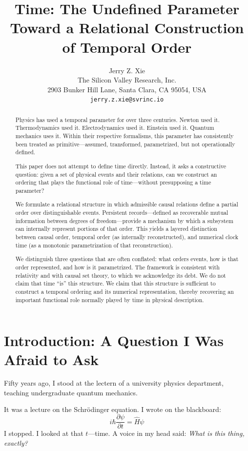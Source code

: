\documentclass[12pt, a4paper]{article}
\title{Time: The Undefined Parameter \\
\large Toward a Relational Construction of Temporal Order}
\author{
  Jerry Z. Xie \\
  \small The Silicon Valley Research, Inc. \\
  \small 2903 Bunker Hill Lane, Santa Clara, CA 95054, USA \\
  \small \texttt{jerry.z.xie@svrinc.io}
}
\date{}
\begin{document}
\maketitle

\begin{abstract}
Physics has used a temporal parameter for over three centuries. Newton used it. Thermodynamics used it. Electrodynamics used it. Einstein used it. Quantum mechanics uses it. Within their respective formalisms, this parameter has consistently been treated as primitive---assumed, transformed, parametrized, but not operationally defined.

This paper does not attempt to define time directly. Instead, it asks a constructive question: given a set of physical events and their relations, can we construct an ordering that plays the functional role of time---without presupposing a time parameter?

We formulate a relational structure in which admissible causal relations define a partial order over distinguishable events. Persistent records---defined as recoverable mutual information between degrees of freedom---provide a mechanism by which a subsystem can internally represent portions of that order. This yields a layered distinction between causal order, temporal order (as internally reconstructed), and numerical clock time (as a monotonic parametrization of that reconstruction).

We distinguish three questions that are often conflated: what orders events, how is that order represented, and how is it parametrized. The framework is consistent with relativity and with causal set theory, to which we acknowledge its debt. We do not claim that time ``is'' this structure. We claim that this structure is sufficient to construct a temporal ordering and its numerical representation, thereby recovering an important functional role normally played by time in physical description.
\end{abstract}

\section{Introduction: A Question I Was Afraid to Ask}

Fifty years ago, I stood at the lectern of a university physics department, teaching undergraduate quantum mechanics.

It was a lecture on the Schr\"odinger equation. I wrote on the blackboard:
\[
i\hbar \frac{\partial \psi}{\partial t} = \hat{H}\psi
\]
I stopped. I looked at that \( t \)---time. A voice in my head said: \textit{What is this thing, exactly?}
\end{document}
